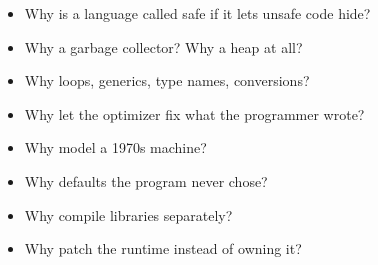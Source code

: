 \begin{sidebox}
\begin{itemize}\itemsep0pt
  \item Why is a language called safe if it lets unsafe code hide?
  \item Why a garbage collector? Why a heap at all?
  \item Why loops, generics, type names, conversions?
  \item Why let the optimizer fix what the programmer wrote?
  \item Why model a 1970s machine?
  \item Why defaults the program never chose?
  \item Why compile libraries separately?
  \item Why patch the runtime instead of owning it?
\end{itemize}
\end{sidebox}
